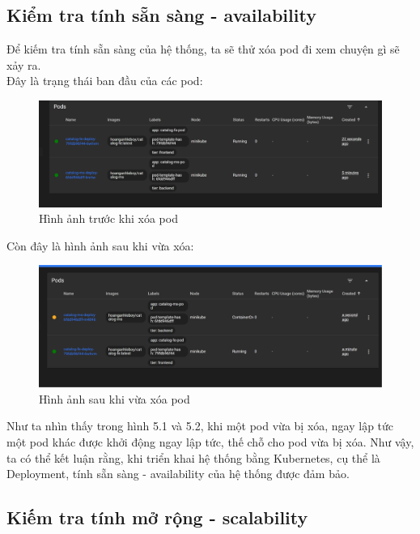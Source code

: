 \subsection{Kiểm tra tính sẵn sàng - availability}
\noindent Để kiếm tra tính sẵn sàng của hệ thống, ta sẽ thử xóa pod đi xem chuyện gì sẽ xảy ra.\\[0.5cm]
Đây là trạng thái ban đầu của các pod:
\begin{figure}[H]
  \begin{center}
  \includegraphics[scale=0.45]{images/hanh/pod_before_delete.png}
  \caption{Hình ảnh trước khi xóa pod}
  \end{center}
\end{figure}
Còn đây là hình ảnh sau khi vừa xóa:
\begin{figure}[H]
  \begin{center}
  \includegraphics[scale=0.45]{images/hanh/pod_after_delete.png}
  \caption{Hình ảnh sau khi vừa xóa pod}
  \end{center}
\end{figure}
Như ta nhìn thấy trong hình 5.1 và 5.2, khi một pod vừa bị xóa, ngay lập tức một pod khác được khởi động ngay lập tức, thế chỗ cho pod vừa bị xóa. Như vậy, ta có thể kết luận rằng, khi triển khai hệ thống bằng Kubernetes, cụ thể là Deployment, tính sẵn sàng - availability của hệ thống được đảm bảo.
\subsection{Kiếm tra tính mở rộng - scalability}
